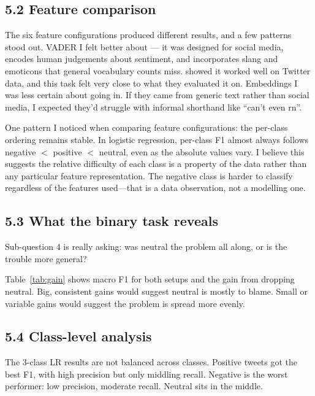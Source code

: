 \documentclass[12pt]{article}
\begin{document}
\subsection*{5.2 Feature comparison}



The six feature configurations produced different results, and a few patterns stood out.
VADER I felt better about --- it was designed for social media, encodes human judgements about sentiment, and incorporates slang and emoticons that general vocabulary counts miss.
\citet{hutto2014vader} showed it worked well on Twitter data, and this task felt very close to what they evaluated it on.
Embeddings I was less certain about going in.
If they came from generic text rather than social media, I expected they'd struggle with informal shorthand like ``can't even rn''.

One pattern I noticed when comparing feature configurations: the per-class ordering remains stable.
In logistic regression, per-class F1 almost always follows negative $<$ positive $<$ neutral, even as the absolute values vary.
I believe this suggests the relative difficulty of each class is a property of the data rather than any particular feature representation.
The negative class is harder to classify regardless of the features used---that is a data observation, not a modelling one.



\subsection*{5.3 What the binary task reveals}



Sub-question 4 is really asking: was neutral the problem all along, or is the trouble more general?

Table~\ref{tab:gain} shows macro F1 for both setups and the gain from dropping neutral.
Big, consistent gains would suggest neutral is mostly to blame.
Small or variable gains would suggest the problem is spread more evenly.



\subsection*{5.4 Class-level analysis}



The 3-class LR results are not balanced across classes.
Positive tweets got the best F1, with high precision but only middling recall.
Negative is the worst performer: low precision, moderate recall.
Neutral sits in the middle.
\end{document}
